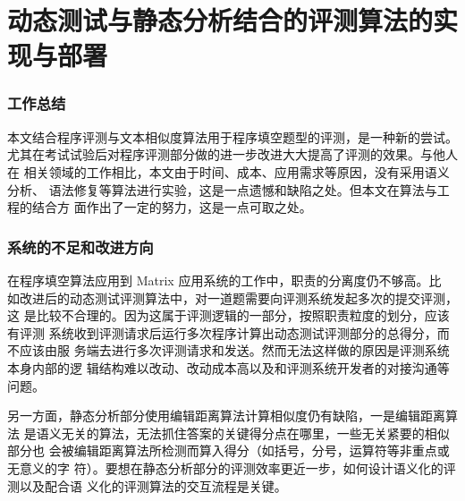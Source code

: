 \chapter{动态测试与静态分析结合的评测算法的实现与部署}
\label{cha:assumption}
\subsection{工作总结}
本文结合程序评测与文本相似度算法用于程序填空题型的评测，是一种新的尝试。
尤其在考试试验后对程序评测部分做的进一步改进大大提高了评测的效果。与他人在
相关领域的工作相比，本文由于时间、成本、应用需求等原因，没有采用语义分析、
语法修复等算法进行实验，这是一点遗憾和缺陷之处。但本文在算法与工程的结合方
面作出了一定的努力，这是一点可取之处。

\subsection{系统的不足和改进方向}
在程序填空算法应用到 Matrix 应用系统的工作中，职责的分离度仍不够高。比
如改进后的动态测试评测算法中，对一道题需要向评测系统发起多次的提交评测，这
是比较不合理的。因为这属于评测逻辑的一部分，按照职责粒度的划分，应该有评测
系统收到评测请求后运行多次程序计算出动态测试评测部分的总得分，而不应该由服
务端去进行多次评测请求和发送。然而无法这样做的原因是评测系统本身内部的逻
辑结构难以改动、改动成本高以及和评测系统开发者的对接沟通等问题。

另一方面，静态分析部分使用编辑距离算法计算相似度仍有缺陷，一是编辑距离算法
是语义无关的算法，无法抓住答案的关键得分点在哪里，一些无关紧要的相似部分也
会被编辑距离算法所检测而算入得分（如括号，分号，运算符等非重点或无意义的字
符）。要想在静态分析部分的评测效率更近一步，如何设计语义化的评测以及配合语
义化的评测算法的交互流程是关键。

\clearpage
